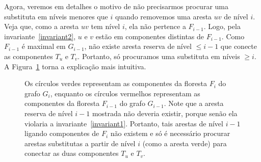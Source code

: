 Agora, veremos em detalhes o motivo de não precisarmos procurar uma substituta em níveis menores que $i$ quando removemos uma aresta $uv$ de nível $i$. Veja que, como a aresta $uv$ tem nível $i$, ela não pertence a $F_{i-1}$. Logo, pela invariante~\ref{invariant2}, $u$ e $v$ estão em componentes distintas de $F_{i-1}$. Como $F_{i-1}$ é maximal em $G_{i-1}$, não existe aresta reserva de nível $\leq i - 1$ que conecte as componentes $T_u$ e $T_v$. Portanto, só procuramos uma substituta em níveis $\geq i$. A Figura~\ref{fig:why-not-search-in-less-or-equal-than-i} torna a explicação mais intuitiva.

\begin{figure}[H]
    \centering
    \caption{Os círculos verdes representam as componentes da floresta $F_i$ do grafo $G_i$, enquanto os círculos vermelhos representam as componentes da floresta $F_{i-1}$ do grafo $G_{i-1}$. Note que a aresta reserva de nível $i-1$ mostrada não deveria existir, porque senão ela violaria a invariante~\ref{invariant1}. Portanto, tais arestas de nível $i-1$ ligando componentes de $F_i$ não existem e só é necessário procurar arestas substitutas a partir de nível $i$ (como a aresta verde) para conectar as duas componentes $T_u$ e $T_v$.}
    \label{fig:why-not-search-in-less-or-equal-than-i}
\end{figure}

